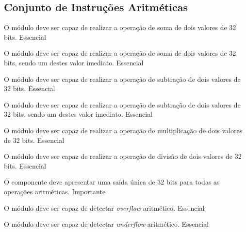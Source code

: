 \subsection{Conjunto de Instruções Aritméticas} 
  
    \begin{functional}
      {O módulo deve ser capaz de realizar a operação de soma de dois valores de 32 bits.}
      {Essencial}
      
      {O módulo deve ser capaz de realizar a operação de soma de dois valores de 32 bits, sendo um destes valor imediato.}
      {Essencial}

      {O módulo deve ser capaz de realizar a operação de subtração de dois valores de 32 bits.}
      {Essencial}
      
      {O módulo deve ser capaz de realizar a operação de subtração de dois valores de 32 bits, sendo um destes valor imediato.}
      {Essencial}

      {O módulo deve ser capaz de realizar a operação de multiplicação de dois valores de 32 bits. }
      {Essencial}

      {O módulo deve ser capaz de realizar a operação de divisão de dois valores de 32 bits.}
      {Essencial} 
     

      {O componente deve apresentar uma saída única de 32 bits para todas as operações aritméticas.}
      {Importante}       

      {O módulo deve ser capaz de detectar \textit{overflow} aritmético.}
      {Essencial}
      
      {O módulo deve ser capaz de detectar \textit{underflow} aritmético.}
      {Essencial}
      
      
    \end{functional}